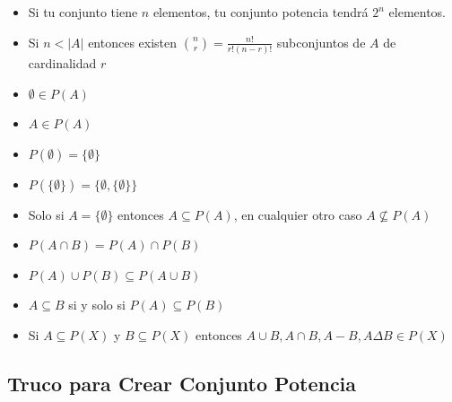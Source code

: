 \documentclass[12pt, fleqn]{report}                             %
\theoremstyle{break}                                            %
\begin{document}
                \begin{itemize}
                    \item Si tu conjunto tiene $n$ elementos, tu conjunto potencia tendrá
                        $2^n$ elementos.

                    \item Si $n < |A|$ entonces existen $\binom{n}{r} = \frac{n!}{r!(n-r)!}$ 
                        subconjuntos de $A$ de cardinalidad $r$

                    \item $\emptyset \in P(A)$

                    \item $A \in P(A)$

                    \item $P(\emptyset) = \{\emptyset\}$

                    \item $P( \{\emptyset\}) = \{\emptyset, \{\emptyset\} \}$

                    \item Solo si $A = \{\emptyset\}$ entonces $A \subseteq P(A)$,
                        en cualquier otro caso $A \nsubseteq P(A)$

                    \item $P(A \cap B) = P(A) \cap P(B)$

                    \item $P(A) \cup P(B) \subseteq P(A \cup B)$

                    \item $A \subseteq B$ si y solo si  $P(A) \subseteq P(B)$ 

                    \item Si $A \subseteq P(X)$ y $B \subseteq P(X)$ entonces 
                    $A \cup B, A \cap B,  A - B,  A \Delta B \in P(X)$

                \end{itemize}



            \clearpage
            \subsection{Truco para Crear Conjunto Potencia}
\end{document}
